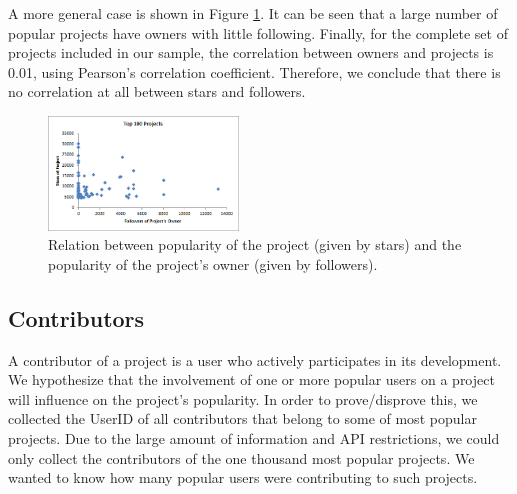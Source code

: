 A more general case is shown in Figure \ref{fig:owner}. It can be seen that a large number of popular projects have owners with little following. Finally, for the complete set of projects included in our sample, the correlation between owners and projects is 0.01, using Pearson's correlation coefficient. Therefore, we conclude that there is no correlation at all between stars and followers.
\begin{figure}
	\centering
	\includegraphics[width=0.45\textwidth]{./img/top100Owner.png}
	\caption{Relation between popularity of the project (given by stars) and the popularity of the project's owner (given by followers).}
	\label{fig:owner}
\end{figure}

\subsection{Contributors}

A contributor of a project is a user who actively participates in its development. We hypothesize that the involvement of one or more popular users on a project will influence on the project's popularity. In order to prove/disprove this, we collected the UserID of all contributors that belong to some of most popular projects. Due to the large amount of information and API restrictions, we could only collect the contributors of the one thousand most popular projects. We wanted to know how many popular users were contributing to such projects.

